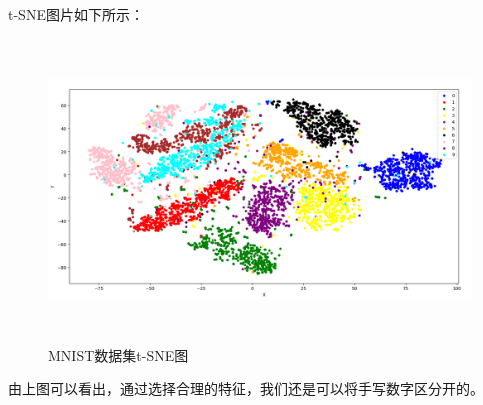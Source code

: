 \documentclass[UTF8]{article}
\begin{document}
t-SNE图片如下所示：
\begin{figure}[H]
	\caption{MNIST数据集t-SNE图}
	\label{f000032}
	\centering
	\includegraphics[height=8cm]{images/f000032}
\end{figure}
由上图可以看出，通过选择合理的特征，我们还是可以将手写数字区分开的。
\end{document}
